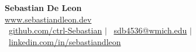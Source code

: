 \documentclass[letterpaper,10pt]{article}
\begin{document}
\begin{center}
	{\LARGE\textbf{Sebastian De Leon}} \\
	\vspace{0.1cm}
	\small\faGlobe \hspace{0.2cm}\href{https://sebastiandleon.dev}{www.sebastiandleon.dev} \\
	\small\faGithub\ \href{https://github.com/ctrl-Sebastian}{github.com/ctrl-Sebastian} $|$
	\faEnvelope\ \href{mailto:sdb4536@wmich.edu}{sdb4536@wmich.edu} $|$
	\faLinkedin\ \href{https://www.linkedin.com/in/sebastiandleon/}{linkedin.com/in/sebastiandleon}
\end{center}
\vspace{-3mm}






% 
\end{document}
